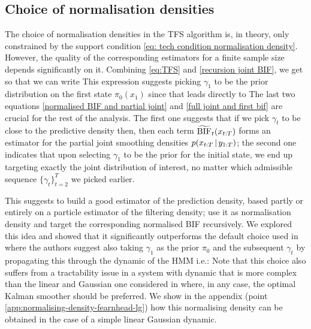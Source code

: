 \subsection{Choice of normalisation densities}
The choice of normalisation densities in the TFS algorithm is, in theory, only constrained by the support condition \eqref{eq: tech condition normalisation density}. However, the quality of the corresponding estimators for a finite sample size depends significantly on it. 
Combining \eqref{eq:TFS} and \eqref{recursion joint BIF}, we get
%
%
so that we can write
%
%
This expression suggests picking $\gamma_{1}$ to be the prior distribution on the first state $\pi_{0}(x_{1})$ since that leads directly to 
%
%
The last two equations \eqref{normalised BIF and partial joint} and \eqref{full joint and first bif} are crucial for the rest of the analysis. The first one suggests that if we pick $\gamma_{t}$ to be close to the predictive density then, then each term $\widetilde{\text{BIF}}_{t}(x_{t:T})$ forms an estimator for the partial joint smoothing densities $p(x_{t:T}\,|\, y_{1:T})$; the second one indicates that upon selecting $\gamma_{1}$ to be the prior for the initial state, we end up targeting exactly the joint distribution of interest, no matter which admissible sequence $\{\gamma_{t}\}_{t=2}^{T}$ we picked earlier. 

This suggests to build a good estimator of the prediction density, based partly or entirely on a particle estimator of the filtering density; use it as normalisation density and target the corresponding normalised BIF recursively. 
We explored this idea and showed that it significantly outperforms the default choice used in \citep{briers10, fearnhead10} where the authors suggest also taking $\gamma_{1}$ as the prior $\pi_{0}$ and the subsequent $\gamma_{t}$ by propagating this through the dynamic of the HMM i.e.:
%
%
Note that this choice also suffers from a tractability issue in a system with dynamic that is more complex than the linear and Gaussian one considered in \citep{fearnhead10} where, in any case, the optimal Kalman smoother should be preferred. We show in the appendix (point \ref{app:normalising-density-fearnhead-lg}) how this normalising density can be obtained in the case of a simple linear Gaussian dynamic.

